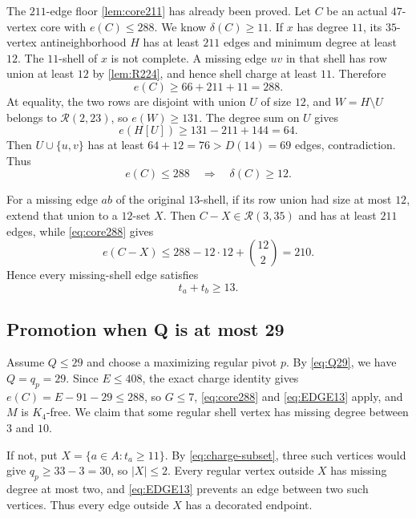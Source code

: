 The $211$-edge floor \cref{lem:core211} has already been proved. Let $C$ be an actual $47$-vertex core with $e(C)\leq288$. We know $\delta(C)\geq11$. If $x$ has degree $11$, its $35$-vertex antineighborhood $H$ has at least $211$ edges and minimum degree at least $12$. The $11$-shell of $x$ is not complete. A missing edge $uv$ in that shell has row union at least $12$ by \cref{lem:R224}, and hence shell charge at least $11$. Therefore
\[
e(C)\geq66+211+11=288.
\]
At equality, the two rows are disjoint with union $U$ of size $12$, and $W=H\setminus U$ belongs to $\mathcal R(2,23)$, so $e(W)\geq131$. The degree sum on $U$ gives
\[
e(H[U])\geq131-211+144=64.
\]
Then $U\cup\{u,v\}$ has at least $64+12=76>D(14)=69$ edges, contradiction. Thus
\begin{equation}
e(C)\leq288\quad\Longrightarrow\quad\delta(C)\geq12.
\label{eq:core288}
\end{equation}

For a missing edge $ab$ of the original $13$-shell, if its row union had size at most $12$, extend that union to a $12$-set $X$. Then $C-X\in\mathcal R(3,35)$ and has at least $211$ edges, while \cref{eq:core288} gives
\[
e(C-X)\leq288-12\cdot12+\binom{12}{2}=210.
\]
Hence every missing-shell edge satisfies
\begin{equation}
t_a+t_b\geq13.
\label{eq:EDGE13}
\end{equation}

\subsection{Promotion when Q is at most 29}

Assume $Q\leq29$ and choose a maximizing regular pivot $p$. By \cref{eq:Q29}, we have $Q=q_p=29$. Since $E\leq408$, the exact charge identity gives $e(C)=E-91-29\leq288$, so $G\leq7$, \cref{eq:core288} and \cref{eq:EDGE13} apply, and $M$ is $K_4$-free. We claim that some regular shell vertex has missing degree between $3$ and $10$.

If not, put $X=\{a\in A:t_a\geq11\}$. By \cref{eq:charge-subset}, three such vertices would give $q_p\geq33-3=30$, so $|X|\leq2$. Every regular vertex outside $X$ has missing degree at most two, and \cref{eq:EDGE13} prevents an edge between two such vertices. Thus every edge outside $X$ has a decorated endpoint.

